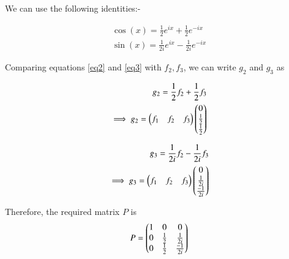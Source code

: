 \documentclass[journal,12pt,twocolumn]{IEEEtran}
\begin{document}
\begin{enumerate}[label=(\alph*)]
		We can use the following identities:-
		
		\begin{align}
			\cos (x) = \frac{1}{2}e^{ix} + \frac{1}{2}e^{-ix} \label{eq2}\\
			\sin (x) = \frac{1}{2i}e^{ix} - \frac{1}{2i}e^{-ix} \label{eq3}
		\end{align}
		
		
		Comparing equations \eqref{eq2} and \eqref{eq3} with $f_2, f_3$, we can write $g_2$ and $g_3$ as 
		
		\begin{align}
			g_2 = \frac{1}{2}f_2 + \frac{1}{2}f_3 \\
			\implies g_2 = \begin{pmatrix}f_1 & f_2 & f_3\end{pmatrix} \begin{pmatrix}0\\\frac{1}{2}\\\frac{1}{2}\end{pmatrix}
		\end{align}
		
		\begin{align}
			g_3 = \frac{1}{2i}f_2 - \frac{1}{2i}f_3 \\
			\implies g_3 = \begin{pmatrix}f_1 & f_2 & f_3\end{pmatrix} \begin{pmatrix}0\\\frac{1}{2i}\\\frac{-1}{2i}\end{pmatrix}
		\end{align}
		
		Therefore, the required matrix $P$ is
		\begin{align}
			P = \begin{pmatrix}1&0&0\\0&\frac{1}{2}&\frac{1}{2i}\\0&\frac{1}{2}&\frac{-1}{2i}\end{pmatrix}
		\end{align}
		
	\end{enumerate}
	
\end{document}
